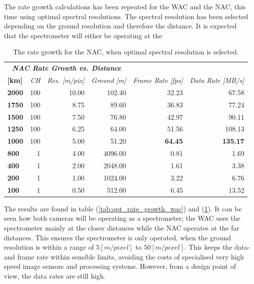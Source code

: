  The rate growth calculations has been repeated for the WAC and the NAC, this time using optimal spectral resolutions. The spectral resolution has been selected depending on the ground resolution and therefore the distance. It is expected that the spectrometer will either be operating at the 
\begin{table}[htb!]
  \centering
    \begin{tabular}{l|r|r|r|r|r|}
\multicolumn{4}{c|}{\textit{\textbf{NAC Rate Growth vs. Distance}}} & \multicolumn{1}{r}{} & \multicolumn{1}{r}{} \bigstrut[b]\\
\cline{1-4}\textbf{[km]} & \textit{CH} & \textit{Res. [m/pix]} & \multicolumn{1}{c|}{\textit{Ground [m]}} & \multicolumn{1}{c}{\textit{Frame Rate [fps]}} & \multicolumn{1}{r}{\textit{Data Rate [MB/s]}} \bigstrut\\
\hline
\textbf{2000} & 100   & 10.00 & 102.40 & 32.23 & 67.58 \bigstrut[t]\\
\textbf{1750} & 100   & 8.75  & 89.60 & 36.83 & 77.24 \\
\textbf{1500} & 100   & 7.50  & 76.80 & 42.97 & 90.11 \\
\textbf{1250} & 100   & 6.25  & 64.00 & 51.56 & 108.13 \\
\textbf{1000} & 100   & 5.00  & 51.20 & \textbf{64.45} & \textbf{135.17} \\
\textbf{800} & 1     & 4.00  & 4096.00 & 0.81  & 1.69 \\
\textbf{400} & 1     & 2.00  & 2048.00 & 1.61  & 3.38 \\
\textbf{200} & 1     & 1.00  & 1024.00 & 3.22  & 6.76 \\
\textbf{100} & 1     & 0.50  & 512.00 & 6.45  & 13.52 \\
\end{tabular}%
  \caption{The rate growth for the NAC, when optimal spectral resolution is selected.}
  \label{tab:opt_rate_growth_nac}%
\end{table}%
The results are found in table (\ref{tab:opt_rate_growth_wac}) and (\ref{tab:opt_rate_growth_nac}). It can be seen how both cameras will be operating as a spectrometer; the WAC uses the spectrometer mainly at the closer distances while the NAC operates at the far distances. This ensures the spectrometer is only operated, when the ground resolution is within a range of $5[m/pixel]$ to $50[m/pixel]$. This keeps the data- and frame rate within sensible limits, avoiding the costs of specialised very high speed image sensors and processing systems. However, from a design point of view, the data rates are still high. 

